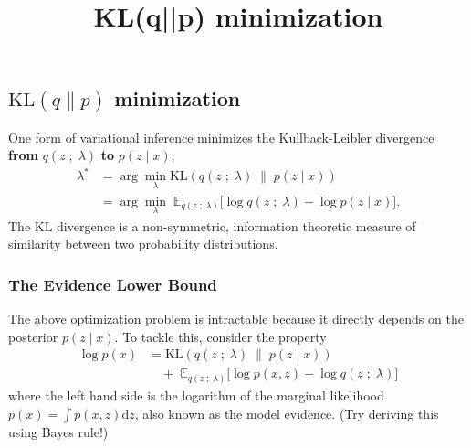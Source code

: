 \title{KL(q||p) minimization}

\subsection{$\text{KL}(q\|p)$ minimization}

One form of variational inference minimizes the Kullback-Leibler divergence
\textbf{from} $q(z\;;\;\lambda)$ \textbf{to} $p(z \mid x)$,
\begin{align*}
  \lambda^*
  &=
  \arg\min_\lambda \text{KL}(
  q(z\;;\;\lambda)
  \;\|\;
  p(z \mid x)
  )\\
  &=
  \arg\min_\lambda\;
  \mathbb{E}_{q(z\;;\;\lambda)}
  \big[
  \log q(z\;;\;\lambda)
  -
  \log p(z \mid x)
  \big].
\end{align*}
The KL divergence is a non-symmetric, information theoretic measure of
similarity between two probability distributions.

\subsubsection{The Evidence Lower Bound}

The above optimization problem is intractable because it directly depends on the
posterior $p(z \mid x)$. To tackle this, consider the property
\begin{align*}
  \log p(x)
  &=
  \text{KL}(
  q(z\;;\;\lambda)
  \;\|\;
  p(z \mid x)
  )\\
  &\quad+\;
  \mathbb{E}_{q(z\;;\;\lambda)}
  \big[
  \log p(x, z)
  -
  \log q(z\;;\;\lambda)
  \big]
\end{align*}
where the left hand side is the logarithm of the marginal likelihood
$p(x) = \int p(x,z) \text{d}z$, also known as the model evidence. (Try
deriving this using Bayes rule!)

